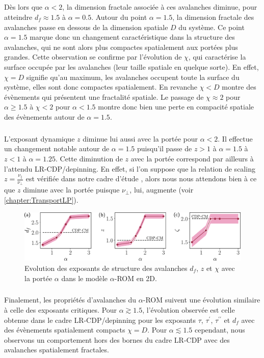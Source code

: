 \subparagraph{}Dès lors que $\alpha < 2$, la dimension fractale associée à ces avalanches diminue, pour atteindre $d_f \approx 1.5$ à $\alpha = 0.5$. Autour du point $\alpha = 1.5$, la dimension fractale des avalanches passe en dessous de la dimension spatiale $D$ du système. Ce point $\alpha = 1.5$ marque donc un changement caractéristique dans la structure des avalanches, qui ne sont alors plus compactes spatialement aux portées plus grandes. Cette observation se confirme par l'évolution de $\chi$, qui caractérise la surface occupée par les avalanches (leur taille spatiale en quelque sorte). En effet, $\chi = D$ signifie qu'au maximum, les avalanches occupent toute la surface du système, elles sont donc compactes spatialement. En revanche $\chi < D$ montre des évènements qui présentent une fractalité spatiale. Le passage de $\chi\approx 2$ pour $\alpha\geq 1.5$ à $\chi < 2$ pour $\alpha < 1.5$ montre donc bien une perte en compacité spatiale des évènements autour de $\alpha = 1.5$.

\subparagraph{}L'exposant dynamique $z$ diminue lui aussi avec la portée pour $\alpha<2$. Il effectue un changement notable autour de $\alpha = 1.5$ puisqu'il passe de $z>1$ à $\alpha=1.5$ à $z<1$ à $\alpha=1.25$. Cette diminution de $z$ avec la portée correspond par ailleurs à l'attendu LR-CDP/depinning. En effet, si l'on suppose que la relation de scaling $z = \frac{\nu_\parallel}{\nu_\perp}$ est vérifiée dans notre cadre d'étude \cite{lubeck_universal_2004}, alors nous nous attendons bien à ce que $z$ diminue avec la portée puisque $\nu_\perp$, lui, augmente (voir \autoref{chapter:TransportLP}).

\begin{figure}[h]
	\centering
	\includegraphics[width=\textwidth]{Chapitre3/Figures/Avalanches/Recap_AvSuspensions.pdf}
	\caption{Evolution des exposants de structure des avalanches $d_f$, $z$ et $\chi$ avec la portée $\alpha$ dans le modèle $\alpha$-ROM en 2D.}
	\label{fig:EvolAvSusp}
\end{figure}

\subparagraph{}Finalement, les propriétés d'avalanches du $\alpha$-ROM suivent une évolution similaire à celle des exposants critiques. Pour $\alpha \gtrsim 1.5$, l'évolution observée est celle obtenue dans le cadre LR-CDP/depinning pour les exposants $\tau$, $\tau^\prime$, $\tau^{\prime\prime}$ et $d_f$ avec des évènements spatialement compacts $\chi=D$. Pour $\alpha\lesssim 1.5$ cependant, nous observons un comportement hors des bornes du cadre LR-CDP avec des avalanches spatialement fractales.

